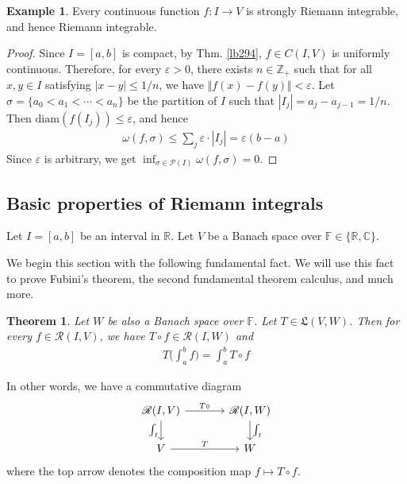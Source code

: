 \documentclass[12pt,b5paper,notitlepage]{article}
\theoremstyle{definition}
\newtheorem{eg}[df]{Example}
\theoremstyle{plain}
\newtheorem{thm}[df]{Theorem}
\newcommand{\fk}{\mathfrak}
\newcommand{\mc}{\mathcal}
\newcommand{\scr}{\mathscr}
\newcommand{\Cbb}{\mathbb C}
\newcommand{\Zbb}{\mathbb Z}
\newcommand{\Rbb}{\mathbb R}
\newcommand{\Fbb}{\mathbb F}
\newcommand{\diam}{\mathrm{diam}}
\newcommand{\eps}{\varepsilon}
\numberwithin{equation}{section}
\begin{document}
\begin{eg}\label{lb377}
Every continuous function $f:I\rightarrow V$ is strongly Riemann integrable, and hence Riemann integrable.
\end{eg}


\begin{proof}
Since $I=[a,b]$ is compact, by Thm. \ref{lb294}, $f\in C(I,V)$ is uniformly continuous. Therefore, for every $\eps>0$, there exists $n\in\Zbb_+$ such that for all $x,y\in I$ satisfying $|x-y|\leq 1/n$, we have $\Vert f(x)-f(y)\Vert<\eps$. Let $\sigma=\{a_0<a_1<\cdots<a_n\}$ be the partition of $I$ such that $|I_j|=a_j-a_{j-1}=1/n$. Then $\diam(f(I_j))\leq\eps$, and hence
\begin{align*}
\omega(f,\sigma)\leq\sum_j \eps\cdot|I_j|=\eps(b-a)
\end{align*}
Since $\eps$ is arbitrary, we get $\inf_{\sigma\in\mc P(I)} \omega(f,\sigma)=0$.
\end{proof}



\subsection{Basic properties of Riemann integrals}


Let $I=[a,b]$ be an interval in $\Rbb$. Let $V$ be a Banach space over $\Fbb\in\{\Rbb,\Cbb\}$. 

We begin this section with the following fundamental fact. We will use this fact to prove Fubini's theorem, the second fundamental theorem calculus, and much more.


\begin{thm}\label{lb392}
Let $W$ be also a Banach space over $\Fbb$. Let $T\in\fk L(V,W)$. Then for every $f\in\scr R(I,V)$, we have $T\circ f\in\scr R(I,W)$ and
\begin{align}
T\Big(\int_a^b f \Big)=\int_a^b T\circ f
\end{align}
\end{thm}

In other words, we have a commutative diagram
\begin{equation}\label{eq166}
\begin{tikzcd}[column sep=large]
\scr R(I,V) \arrow[r,"T\circ"] \arrow[d,"\int_I"'] & \scr R(I,W) \arrow[d,"\int_I"] \\
V \arrow[r,"T"]           & W        
\end{tikzcd} 
\end{equation}
where the top arrow denotes the composition map $f\mapsto T\circ f$. 
\end{document}
